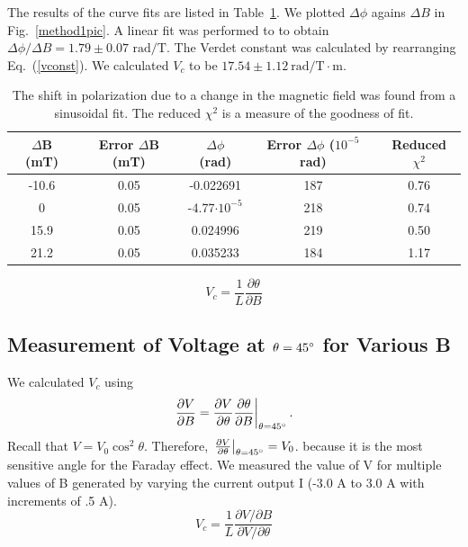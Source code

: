\documentclass[prb,preprint]{revtex4-1}
\begin{document}
{{The results of the curve fits are listed in Table~\ref{shift table}. We plotted $\Delta \phi$ agains $\Delta B$ in Fig.~\ref{method1pic}. A linear fit was performed to to obtain $\Delta \phi/\Delta B=1.79 \pm 0.07\textrm{~rad/T}$. The Verdet constant was calculated by rearranging Eq.~(\ref{vconst}). We calculated $V_c$ to be $17.54 \pm 1.12 \mathrm{~rad/T} \cdot \textrm{m}$.
\begin{table}
    \begin{ruledtabular}
        \begin{tabular}{ccccc}
            $\Delta$B (mT)&Error $\Delta$B (mT)&$\Delta \phi$ (rad)&Error $\Delta\phi$ ($10^{-5}$ rad)&Reduced $\chi^2$ \\  \hline
            -10.6 & 0.05 & -0.022691 & 187 & 0.76 \\
            0     & 0.05 & -4.77$\cdot10^{-5}$ & 218 & 0.74 \\
            15.9  & 0.05 & 0.024996  & 219 & 0.50 \\
            21.2  & 0.05 & 0.035233  & 184 & 1.17
        \end{tabular}
    \end{ruledtabular}
\caption{\label{shift table}The shift in polarization due to a change in the magnetic field was found from a sinusoidal fit. The reduced $\chi^2$ is a measure of the goodness of fit.}
\end{table}
\begin{equation}
V_{c} =\frac{1}{L} \frac{\partial \theta}{\partial B} 
\end{equation}
}


\subsection{Measurement of Voltage at $\theta = 45\degree$ for Various B}
{We calculated $V_{c}$ using 
\begin{equation}
\left. \frac{\partial V}{\partial B}=\frac{\partial V}{\partial \theta} \frac{\partial \theta}{\partial B}\right|_{\theta=45\degree}.
\end{equation}
Recall that
$V=V_{0}\cos^2{\theta}$. Therefore,  $\left.\frac{\partial V}{\partial \theta}\right|_{\theta=45\degree} =V_0$.  because it is the most sensitive angle for the Faraday effect. We measured the value of V for multiple values of B generated by varying the current output I (-3.0 A to 3.0 A with increments of .5 A).
\begin{equation}
V_{c} =\frac{1}{L}  \frac{\partial V/\partial B}{\partial V/\partial \theta} 
\end{equation}

}}
\end{document}
